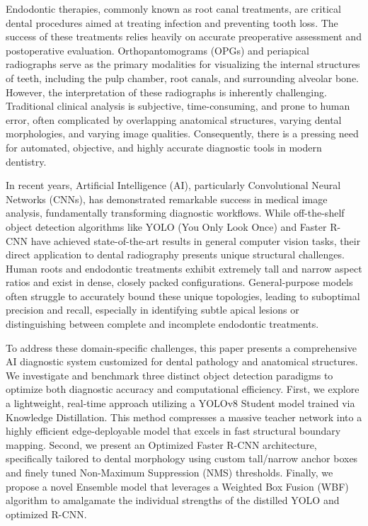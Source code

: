 \documentclass[conference]{IEEEtran}
\begin{document}
Endodontic therapies, commonly known as root canal treatments, are critical dental procedures aimed at treating infection and preventing tooth loss. The success of these treatments relies heavily on accurate preoperative assessment and postoperative evaluation. Orthopantomograms (OPGs) and periapical radiographs serve as the primary modalities for visualizing the internal structures of teeth, including the pulp chamber, root canals, and surrounding alveolar bone. However, the interpretation of these radiographs is inherently challenging. Traditional clinical analysis is subjective, time-consuming, and prone to human error, often complicated by overlapping anatomical structures, varying dental morphologies, and varying image qualities. Consequently, there is a pressing need for automated, objective, and highly accurate diagnostic tools in modern dentistry.

In recent years, Artificial Intelligence (AI), particularly Convolutional Neural Networks (CNNs), has demonstrated remarkable success in medical image analysis, fundamentally transforming diagnostic workflows. While off-the-shelf object detection algorithms like YOLO (You Only Look Once) and Faster R-CNN have achieved state-of-the-art results in general computer vision tasks, their direct application to dental radiography presents unique structural challenges. Human roots and endodontic treatments exhibit extremely tall and narrow aspect ratios and exist in dense, closely packed configurations. General-purpose models often struggle to accurately bound these unique topologies, leading to suboptimal precision and recall, especially in identifying subtle apical lesions or distinguishing between complete and incomplete endodontic treatments.

To address these domain-specific challenges, this paper presents a comprehensive AI diagnostic system customized for dental pathology and anatomical structures. We investigate and benchmark three distinct object detection paradigms to optimize both diagnostic accuracy and computational efficiency. First, we explore a lightweight, real-time approach utilizing a YOLOv8 Student model trained via Knowledge Distillation. This method compresses a massive teacher network into a highly efficient edge-deployable model that excels in fast structural boundary mapping. Second, we present an Optimized Faster R-CNN architecture, specifically tailored to dental morphology using custom tall/narrow anchor boxes and finely tuned Non-Maximum Suppression (NMS) thresholds. Finally, we propose a novel Ensemble model that leverages a Weighted Box Fusion (WBF) algorithm to amalgamate the individual strengths of the distilled YOLO and optimized R-CNN. 
\end{document}
